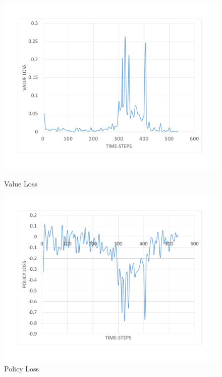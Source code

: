 \begin{figure}[H]
	\advance\leftskip-4cm
	\includegraphics[width=\linewidth]{Figures/ValueLoss}
	\caption{Value Loss}\label{fig:ValueLoss}
	\endminipage\hfill
	\includegraphics[width=\textwidth]{Figures/PolicyLoss}
	\caption{Policy Loss}
	\label{fig:PolicyLoss}
	\endminipage
\end{figure}
